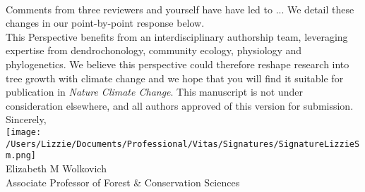 \documentclass[11pt,a4paper]{article}
\begin{document}
\vspace{1.5ex}\\
Comments from three reviewers and yourself have have led to ...  We detail these changes in our point-by-point response below. 
\vspace{1.5ex}\\
This Perspective benefits from an interdisciplinary authorship team, leveraging expertise from dendrochonology, community ecology, physiology and phylogenetics. We believe this perspective could therefore reshape research into tree growth with climate change and we hope that you will find it suitable for publication in \emph{Nature Climate Change}. This manuscript is not under consideration elsewhere, and all authors approved of this version for submission. 
\vspace{1.5ex}\\
Sincerely,\\

\texttt{[image: /Users/Lizzie/Documents/Professional/Vitas/Signatures/SignatureLizzieSm.png]} \\

\noindent Elizabeth M Wolkovich\\
Associate Professor of Forest \& Conservation Sciences\\ 


\newpage

\end{document}
